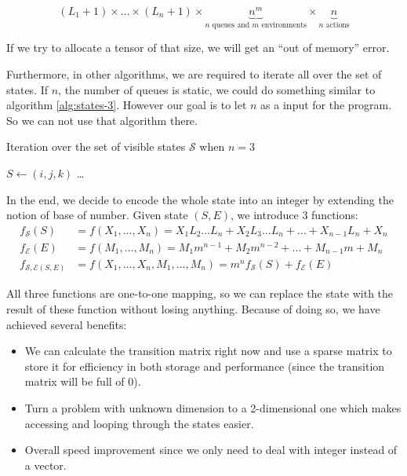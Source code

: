 \documentclass[
  a4paper, xcolor = usenames,dvipsnames]{article}
\providecommand{\tightlist}{%
  \setlength{\itemsep}{0pt}\setlength{\parskip}{0pt}}
\theoremstyle{definition}
\theoremstyle{definition}
\theoremstyle{definition}
\theoremstyle{definition}
\theoremstyle{remark}
\begin{document}
\[
(L_{1} + 1) \times \dots \times (L_{n} + 1) \times \underbrace{n^{m}}_{n \text{ queues and } m \text{ environments}} \times \underbrace{n}_{n \text{ actions}}
\]

If we try to allocate a tensor of that size, we will get an ``out of memory'' error.

Furthermore, in other algorithms, we are required to iterate all over the set of states. If \(n\), the number of queues is static, we could do something similar to algorithm \ref{alg:states-3}. However our goal is to let \(n\) as a input for the program. So we can not use that algorithm there.

\begin{algorithm}
\caption{Iteration over the set of visible states $\mathcal{S}$ when $n = 3$} \label{alg:states-3}
 {
   {
     {
      $S \gets (i, j, k)$\;
      \dots\;
    }
  }
}
\end{algorithm}

In the end, we decide to encode the whole state into an integer by extending the notion of base of number. Given state \((S, E)\), we introduce 3 functions:
\[
\begin{aligned}
f_{\mathcal{S}}(S) &= f(X_{1}, \dots, X_{n}) = X_{1} L_{2} \dots L_{n} + X_{2} L_{3} \dots L_{n} + \dots + X_{n - 1} L_{n} + X_{n} \\
f_{\mathcal{E}}(E) &= f(M_{1}, \dots, M_{n}) = M_{1} m^{n - 1} + M_{2} m^{n - 2} + \dots + M_{n - 1} m + M_{n} \\
f_{\mathcal{S, E}(S, E)} &= f(X_{1}, \dots, X_{n}, M_{1}, \dots, M_{n}) = m^{n} f_{\mathcal{S}}(S) + f_{\mathcal{E}}(E)
\end{aligned}
\]

All three functions are one-to-one mapping, so we can replace the state with the result of these function without losing anything. Because of doing so, we have achieved several benefits:

\begin{itemize}
\tightlist
\item
  We can calculate the transition matrix right now and use a sparse matrix to store it for efficiency in both storage and performance (since the transition matrix will be full of 0).
\item
  Turn a problem with unknown dimension to a 2-dimensional one which makes accessing and looping through the states easier.
\item
  Overall speed improvement since we only need to deal with integer instead of a vector.
\end{itemize}
\end{document}
